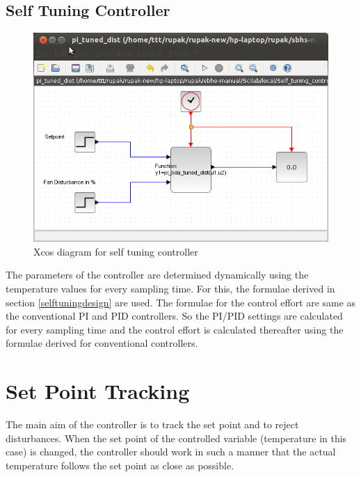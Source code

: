 \subsection{Self Tuning Controller}
\begin{figure}[h]
\centering
	\includegraphics[width = \textwidth]{Vikas_self/report_tex/implementation/pi_dist_self.png}
		\caption{Xcos diagram for self tuning controller}
	\label{selftuning}
\end{figure}

The parameters of the controller are determined dynamically using the temperature values for every sampling time. 
For this, the formulae derived in section \ref{selftuningdesign} are used. The formulae for the control effort are same 
as the conventional PI and PID controllers. So the PI/PID settings are calculated for every sampling time and the control 
effort is calculated thereafter using the formulae derived for conventional controllers.

\section{Set Point Tracking}

The main aim of the controller is to track the set point and to reject disturbances. When the set point of the controlled
variable (temperature in this case) is changed, the controller should work in such a manner that the actual temperature
follows the set point as close as possible.\\

